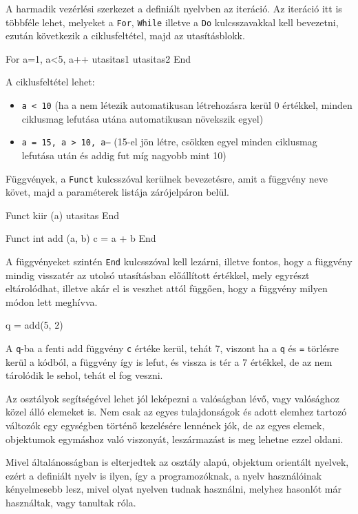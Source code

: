 A harmadik vezérlési szerkezet a definiált nyelvben az iteráció. Az iteráció itt is többféle lehet, melyeket a \texttt{For}, \texttt{While} illetve a \texttt{Do} kulcsszavakkal kell bevezetni, ezután következik a ciklusfeltétel, majd az utasításblokk.
\begin{cpp}
For a=1, a<5, a++
	utasitas1
	utasitas2
End
\end{cpp}

A ciklusfeltétel lehet:
\begin{itemize}
    \item  \texttt{a < 10} (ha a nem létezik automatikusan létrehozásra kerül 0 értékkel, minden ciklusmag lefutása utána automatikusan növekszik egyel)
    \item \texttt{a = 15, a > 10, a--} (15-el jön létre, csökken egyel minden ciklusmag lefutása után és addig fut míg nagyobb mint 10)
\end{itemize}

Függvények, a \texttt{Funct} kulcsszóval kerülnek bevezetésre, amit a függvény neve követ, majd a paraméterek listája zárójelpáron belül.
\begin{cpp}
Funct kiir (a)
	utasitas
End

Funct int add (a, b)
	c = a + b
End
\end{cpp}

A függvényeket szintén \texttt{End} kulcsszóval kell lezárni, illetve fontos, hogy a függvény mindig visszatér az utolsó utasításban előállított értékkel, mely egyrészt eltárolódhat, illetve akár el is veszhet attól függően, hogy a függvény milyen módon lett meghívva.
\begin{cpp}
q = add(5, 2)
\end{cpp}

A \texttt{q}-ba a fenti add függvény \texttt{c} értéke kerül, tehát 7, viszont ha a \texttt{q} és \texttt{=} törlésre kerül a kódból, a függvény így is lefut, és vissza is tér a 7 értékkel, de az nem tárolódik le sehol, tehát el fog veszni.

Az osztályok segítségével lehet jól leképezni a valóságban lévő, vagy valósághoz közel álló elemeket is. Nem csak az egyes tulajdonságok és adott elemhez tartozó változók egy egységben történő kezelésére lennének jók, de az egyes elemek, objektumok egymáshoz való viszonyát, leszármazást is meg lehetne ezzel oldani.

Mivel általánosságban is elterjedtek az osztály alapú, objektum orientált nyelvek, ezért a definiált nyelv is ilyen, így a programozóknak, a nyelv használóinak kényelmesebb lesz, mivel olyat nyelven tudnak használni, melyhez hasonlót már használtak, vagy tanultak róla.

